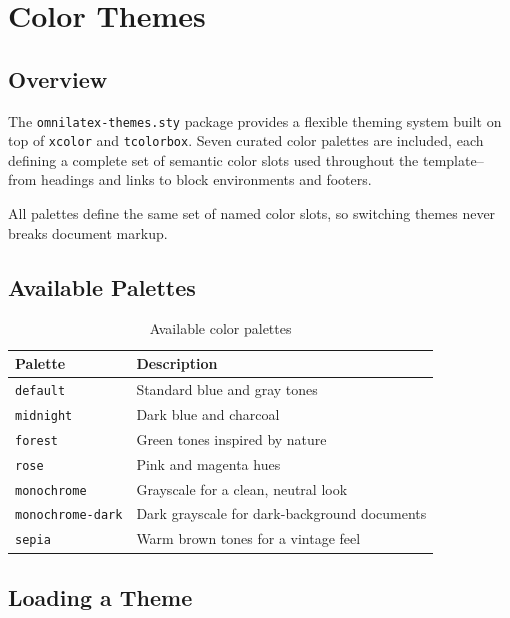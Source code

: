\chapter{Color Themes}
\label{ch:color-themes}

\section{Overview}

The \texttt{omnilatex-themes.sty} package provides a flexible theming system
built on top of \texttt{xcolor} and \texttt{tcolorbox}.  Seven curated color
palettes are included, each defining a complete set of semantic color slots
used throughout the template--from headings and links to block environments
and footers.

All palettes define the same set of named color slots, so switching themes
never breaks document markup.

\section{Available Palettes}

\begin{table}[htbp]
  \centering
  \begin{tabular}{ll}
    \toprule
    \textbf{Palette} & \textbf{Description} \\
    \midrule
    \texttt{default}        & Standard blue and gray tones \\
    \texttt{midnight}       & Dark blue and charcoal \\
    \texttt{forest}         & Green tones inspired by nature \\
    \texttt{rose}           & Pink and magenta hues \\
    \texttt{monochrome}     & Grayscale for a clean, neutral look \\
    \texttt{monochrome-dark}& Dark grayscale for dark-background documents \\
    \texttt{sepia}          & Warm brown tones for a vintage feel \\
    \bottomrule
  \end{tabular}
  \caption{Available color palettes}
\end{table}

\section{Loading a Theme}


